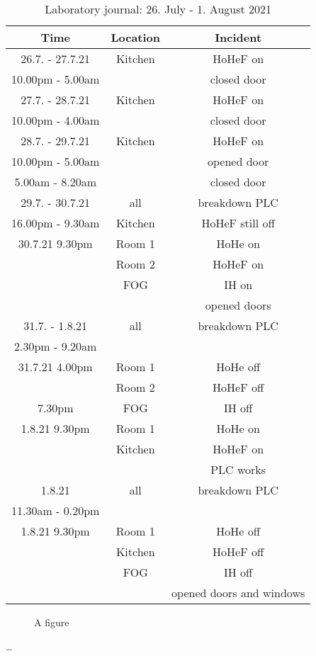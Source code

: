 \begin{table}[H]
    \centering
    \begin{tabular}{c|c|c}
        \textbf{Time} & \textbf{Location} & \textbf{Incident }\\
        \hline
        \hline
        26.7. - 27.7.21 & Kitchen & HoHeF on\\
        10.00pm - 5.00am & & closed door\\
        \hline
        27.7. - 28.7.21 & Kitchen & HoHeF on\\
        10.00pm - 4.00am & & closed door\\
        \hline
        28.7. - 29.7.21 & Kitchen & HoHeF on\\
        10.00pm - 5.00am & & opened door\\
        5.00am - 8.20am & & closed door\\
        \hline
        29.7. - 30.7.21 & all & breakdown PLC\\
        16.00pm - 9.30am & Kitchen & HoHeF still off\\
        \hline
        30.7.21 9.30pm & Room 1 & HoHe on\\
        & Room 2 & HoHeF on\\
        & FOG & IH on\\
        && opened doors\\
        \hline
        31.7. - 1.8.21 & all & breakdown PLC\\
        2.30pm - 9.20am &&\\
        \hline
        31.7.21 4.00pm & Room 1 & HoHe off\\
        & Room 2 & HoHeF off\\
        7.30pm & FOG & IH off\\
        \hline
        1.8.21 9.30pm & Room 1 & HoHe on\\
        & Kitchen & HoHeF on\\
       && PLC works\\
       \hline
        1.8.21 & all & breakdown PLC\\
        11.30am - 0.20pm &&\\
        \hline
        1.8.21 9.30pm & Room 1 & HoHe off\\
        & Kitchen & HoHeF off\\
        & FOG & IH off\\
        && opened doors and windows\\
    \end{tabular}
    \caption{Laboratory journal: 26. July - 1. August 2021}
    \label{tab:Experiment2app}
\end{table}

\setcounter{figure}{0}
		
\begin{figure} [ht]
  \centering
  \caption{A figure}
  \label{fig:anotherfigure}
\end{figure}


\dots